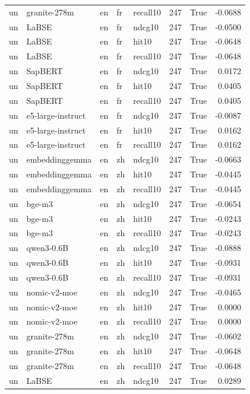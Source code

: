 \begin{tabular}{lllllrrr}
un & granite-278m & en & fr & recall10 & 247 & True & -0.0688 \\
un & LaBSE & en & fr & ndcg10 & 247 & True & -0.0500 \\
un & LaBSE & en & fr & hit10 & 247 & True & -0.0648 \\
un & LaBSE & en & fr & recall10 & 247 & True & -0.0648 \\
un & SapBERT & en & fr & ndcg10 & 247 & True & 0.0172 \\
un & SapBERT & en & fr & hit10 & 247 & True & 0.0405 \\
un & SapBERT & en & fr & recall10 & 247 & True & 0.0405 \\
un & e5-large-instruct & en & fr & ndcg10 & 247 & True & -0.0087 \\
un & e5-large-instruct & en & fr & hit10 & 247 & True & 0.0162 \\
un & e5-large-instruct & en & fr & recall10 & 247 & True & 0.0162 \\
un & embeddinggemma & en & zh & ndcg10 & 247 & True & -0.0663 \\
un & embeddinggemma & en & zh & hit10 & 247 & True & -0.0445 \\
un & embeddinggemma & en & zh & recall10 & 247 & True & -0.0445 \\
un & bge-m3 & en & zh & ndcg10 & 247 & True & -0.0654 \\
un & bge-m3 & en & zh & hit10 & 247 & True & -0.0243 \\
un & bge-m3 & en & zh & recall10 & 247 & True & -0.0243 \\
un & qwen3-0.6B & en & zh & ndcg10 & 247 & True & -0.0888 \\
un & qwen3-0.6B & en & zh & hit10 & 247 & True & -0.0931 \\
un & qwen3-0.6B & en & zh & recall10 & 247 & True & -0.0931 \\
un & nomic-v2-moe & en & zh & ndcg10 & 247 & True & -0.0465 \\
un & nomic-v2-moe & en & zh & hit10 & 247 & True & 0.0000 \\
un & nomic-v2-moe & en & zh & recall10 & 247 & True & 0.0000 \\
un & granite-278m & en & zh & ndcg10 & 247 & True & -0.0602 \\
un & granite-278m & en & zh & hit10 & 247 & True & -0.0648 \\
un & granite-278m & en & zh & recall10 & 247 & True & -0.0648 \\
un & LaBSE & en & zh & ndcg10 & 247 & True & 0.0289 \\

\end{tabular}
